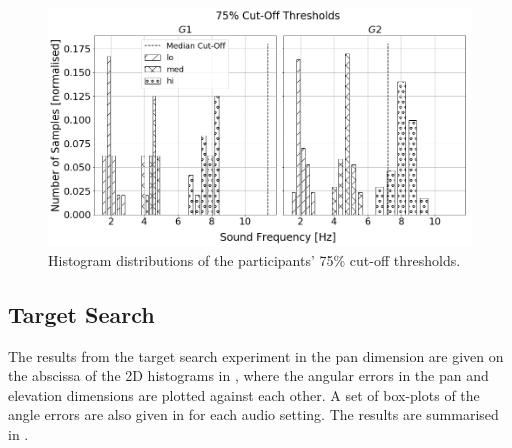\documentclass[]{interact}
\begin{document}
\begin{figure}
  \centering
  \includegraphics[width=1.0\textwidth]{figures/pitch_thresholds_limits.png}
  \caption{Histogram distributions of the participants' 75\% cut-off thresholds. }\label{fig:pitch-thresholds-hist}
\end{figure}

\subsection{Target Search}

The results from the target search experiment in the pan dimension are given on the abscissa of the 2D histograms in , where the angular errors in the pan and elevation dimensions are plotted against each other. 
A set of box-plots of the angle errors are also given in  for each audio setting.
The results are summarised in .
\end{document}
